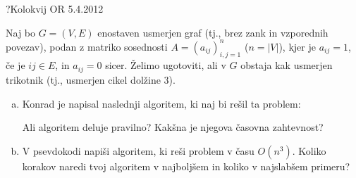 \begin{naloga}{?}{Kolokvij OR 5.4.2012}
\begin{vprasanje}
Naj bo $G = (V, E)$ enostaven usmerjen graf
(tj., brez zank in vzporednih povezav),
podan z matriko sosednosti $A = (a_{ij})_{i,j=1}^n$ ($n = |V|$),
kjer je $a_{ij} = 1$, če je $ij \in E$, in $a_{ij} = 0$ sicer.
Želimo ugotoviti, ali v $G$ obstaja kak usmerjen trikotnik
(tj., usmerjen cikel dolžine $3$).
\begin{enumerate}[(a)]
\item Konrad je napisal naslednji algoritem, ki naj bi rešil ta problem:
\begin{small}
\begin{algorithmic}
                    \State \Return \True
                \EndIf
            \EndFor
        \EndFor
    \EndFor
\EndFor
\State \Return \False
\end{algorithmic}
\end{small}
Ali algoritem deluje pravilno?
Kakšna je njegova časovna zahtevnost?

\item V psevdokodi napiši algoritem, ki reši problem v času $O(n^3)$.
Koliko korakov naredi tvoj algoritem v najboljšem
in koliko v najslabšem primeru?
\end{enumerate}
\end{vprasanje}
\begin{odgovor}
\end{odgovor}
\end{naloga}

